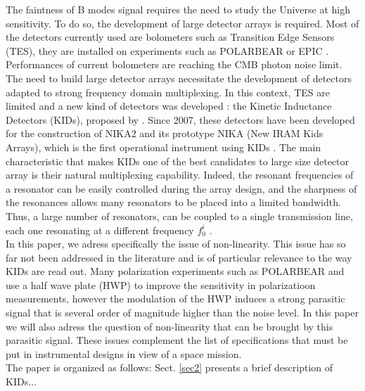 The faintness of B modes signal requires the need to study the Universe at high sensitivity. To do so, the development of large detector arrays is required. Most of the detectors currently used are bolometers such as Transition Edge Sensors (TES), they are installed on experiments such as POLARBEAR \citep{2014ApJ...794..171P} or EPIC \citep{2008arXiv0805.4207B}. Performances of current bolometers are reaching the CMB photon noise limit. The need to build large detector arrays necessitate the development of detectors adapted to strong frequency domain multiplexing. In this context, TES are limited and a new kind of detectors was developed : the Kinetic Inductance Detectors (KIDs), proposed by \citet{2003Natur.425..817D}. Since 2007, these detectors have been developed for the construction of NIKA2 and its prototype NIKA (New IRAM Kids Arrays), which is the first operational instrument using KIDs \citep{2010A&A...521A..29M,2016JLTP..184..816C}. The main characteristic that makes KIDs one of the best candidates to large size detector array is their natural multiplexing capability. Indeed, the resonant frequencies of a resonator can be easily controlled during the array design, and the sharpness of the resonances allows many resonators to be placed into a limited bandwidth. Thus, a large number of resonators, can be coupled to a single transmission line, each one resonating at a different frequency $f_{0}^{i}$ \citep{2010A&A...521A..29M,Calvo2008}.\\
In this paper, we adress specifically the issue of non-linearity. This issue has so far not been addressed in the literature and is of particular relevance to the way KIDs are read out. Many polarization experiments such as POLARBEAR \citep{2017JCAP...05..008T} and  \citep{2017A&A...599A..34R} use a half wave plate (HWP) to improve the sensitivity in polarizatioon measurements, however the modulation of the HWP induces a strong parasitic signal that is several order of magnitude higher than the noise level. In this paper we will also adress the question of non-linearity that can be brought by this parasitic signal. These issues complement the list of specifications that must be put in instrumental designs in view of a space mission.\\
The paper is organized as follows:
Sect. \ref{sec2} presents a brief description of KIDs...